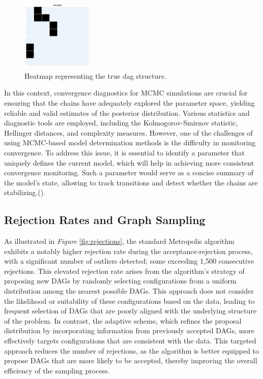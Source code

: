 \documentclass{report}
\begin{document}
\begin{figure}[h] 
	\centering
	\includegraphics[width=0.3\textwidth]{Figures/Overall_comparison/heat_true.png}
	\caption{Heatmap representing the true dag structure.}
	\label{fig:heat-true}
\end{figure}

In this context, convergence diagnostics for MCMC simulations are crucial for ensuring that the chains have adequately explored the parameter space, yielding reliable and valid estimates of the posterior distribution. Various statistics and diagnostic tools are employed, including the Kolmogorov-Smirnov statistic, Hellinger distances, and complexity measures.
However, one of the challenges of using MCMC-based model determination methods is the difficulty in monitoring convergence. To address this issue, it is essential to identify a parameter that uniquely defines the current model, which will help in achieving more consistent convergence monitoring. Such a parameter would serve as a concise summary of the model’s state, allowing   to track transitions and detect whether the chains are stabilizing.(\citet{brooks2003nonparametric}).

\subsection{Rejection Rates and Graph Sampling}

As illustrated in \textit{Figure} \ref{fig:rejections}, the standard Metropolis algorithm exhibits a notably higher rejection rate during the acceptance-rejection process, with a significant number of outliers detected; some exceeding 1,500 consecutive rejections. This elevated rejection rate arises from the algorithm's strategy of proposing new DAGs by randomly selecting configurations from a uniform distribution among the nearest possible DAGs. This approach does not consider the likelihood or suitability of these configurations based on the data, leading to frequent selection of DAGs that are poorly aligned with the underlying structure of the problem.
In contrast, the adaptive scheme, which refines the proposal distribution by incorporating information from previously accepted DAGs, more effectively targets configurations that are consistent with the data. This targeted approach reduces the number of rejections, as the algorithm is better equipped to propose DAGs that are more likely to be accepted, thereby improving the overall efficiency of the sampling process.
\end{document}

